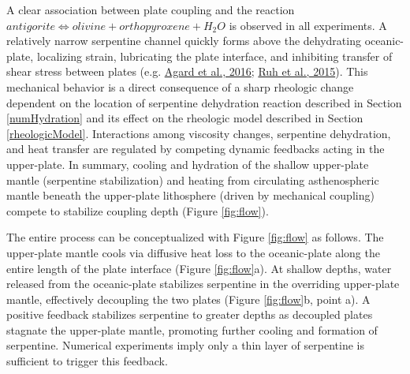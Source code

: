 A clear association between plate coupling and the reaction \(antigorite \allowbreak \Leftrightarrow olivine + orthopyroxene + H_{2}O\) is observed in all experiments. A relatively narrow serpentine channel quickly forms above the dehydrating oceanic-plate, localizing strain, lubricating the plate interface, and inhibiting transfer of shear stress between plates (e.g. \protect\hyperlink{ref-agard2016}{Agard et al., 2016}; \protect\hyperlink{ref-ruh2015}{Ruh et al., 2015}). This mechanical behavior is a direct consequence of a sharp rheologic change dependent on the location of serpentine dehydration reaction described in Section \ref{numHydration} and its effect on the rheologic model described in Section \ref{rheologicModel}. Interactions among viscosity changes, serpentine dehydration, and heat transfer are regulated by competing dynamic feedbacks acting in the upper-plate. In summary, cooling and hydration of the shallow upper-plate mantle (serpentine stabilization) and heating from circulating asthenospheric mantle beneath the upper-plate lithosphere (driven by mechanical coupling) compete to stabilize coupling depth (Figure \ref{fig:flow}).

The entire process can be conceptualized with Figure \ref{fig:flow} as follows. The upper-plate mantle cools via diffusive heat loss to the oceanic-plate along the entire length of the plate interface (Figure \ref{fig:flow}a). At shallow depths, water released from the oceanic-plate stabilizes serpentine in the overriding upper-plate mantle, effectively decoupling the two plates (Figure \ref{fig:flow}b, point a). A positive feedback stabilizes serpentine to greater depths as decoupled plates stagnate the upper-plate mantle, promoting further cooling and formation of serpentine. Numerical experiments imply only a thin layer of serpentine is sufficient to trigger this feedback.

